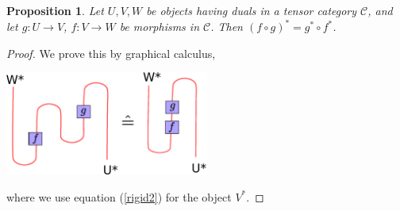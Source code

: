 \documentclass[11pt]{book}
\newtheorem{Prop}[theorem]{Proposition}
\theoremstyle{Rem}
\theoremstyle{definition}
\numberwithin{equation}{section}
\newcommand\id{\operatorname{id}}
\newcommand\ot{\otimes}
\newcommand\C{\mathcal C}
\newcommand\ev{\operatorname{ev}}
\newcommand\coev{\operatorname{coev}}
\begin{document}
\begin{Prop}
Let $U, V, W$ be objects having duals in a tensor category $\C$, and let $g: U\rightarrow V$, $ f:V\rightarrow W$ be morphisms in $\C$. Then $(f \circ g)^* = g^*\circ f^*$.
\end{Prop}
\begin{proof}
We prove this by graphical calculus,
\begin{center}
\includegraphics[width=0.5\textwidth]{dualcomposition.eps}
\end{center}
where we use equation (\ref{rigid2}) for the object $V^*$.

\end{proof}
\end{document}
